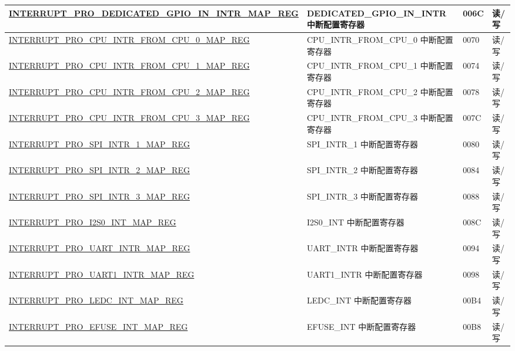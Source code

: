\begin{longtable}{ | m{9.3cm} | m{9.2cm} | m{1.3cm} | m{1.2cm} | }
\hyperref[regdesc:INTERRUPTPRODEDICATEDGPIOININTRMAPREG]{INTERRUPT\_PRO\_DEDICATED\_GPIO\_IN\_INTR\_MAP\_REG} & DEDICATED\_GPIO\_IN\_INTR 中断配置寄存器 & \hexprefix{}006C &读/写 \\ \hline
\hyperref[regdesc:INTERRUPTPROCPUINTRFROMCPU0MAPREG]{INTERRUPT\_PRO\_CPU\_INTR\_FROM\_CPU\_0\_MAP\_REG} & CPU\_INTR\_FROM\_CPU\_0 中断配置寄存器 & \hexprefix{}0070 &读/写 \\ \hline
\hyperref[regdesc:INTERRUPTPROCPUINTRFROMCPU1MAPREG]{INTERRUPT\_PRO\_CPU\_INTR\_FROM\_CPU\_1\_MAP\_REG} & CPU\_INTR\_FROM\_CPU\_1 中断配置寄存器 & \hexprefix{}0074 &读/写 \\ \hline
\hyperref[regdesc:INTERRUPTPROCPUINTRFROMCPU2MAPREG]{INTERRUPT\_PRO\_CPU\_INTR\_FROM\_CPU\_2\_MAP\_REG} & CPU\_INTR\_FROM\_CPU\_2 中断配置寄存器 & \hexprefix{}0078 &读/写 \\ \hline
\hyperref[regdesc:INTERRUPTPROCPUINTRFROMCPU3MAPREG]{INTERRUPT\_PRO\_CPU\_INTR\_FROM\_CPU\_3\_MAP\_REG} & CPU\_INTR\_FROM\_CPU\_3 中断配置寄存器 & \hexprefix{}007C &读/写 \\ \hline
\hyperref[regdesc:INTERRUPTPROSPIINTR1MAPREG]{INTERRUPT\_PRO\_SPI\_INTR\_1\_MAP\_REG} & SPI\_INTR\_1 中断配置寄存器 & \hexprefix{}0080 &读/写 \\ \hline
\hyperref[regdesc:INTERRUPTPROSPIINTR2MAPREG]{INTERRUPT\_PRO\_SPI\_INTR\_2\_MAP\_REG} & SPI\_INTR\_2 中断配置寄存器 & \hexprefix{}0084 &读/写 \\ \hline
\hyperref[regdesc:INTERRUPTPROSPIINTR3MAPREG]{INTERRUPT\_PRO\_SPI\_INTR\_3\_MAP\_REG} & SPI\_INTR\_3 中断配置寄存器 & \hexprefix{}0088 &读/写 \\ \hline
\hyperref[regdesc:INTERRUPTPROI2S0INTMAPREG]{INTERRUPT\_PRO\_I2S0\_INT\_MAP\_REG} & I2S0\_INT 中断配置寄存器 & \hexprefix{}008C &读/写 \\ \hline
\hyperref[regdesc:INTERRUPTPROUARTINTRMAPREG]{INTERRUPT\_PRO\_UART\_INTR\_MAP\_REG} & UART\_INTR 中断配置寄存器 & \hexprefix{}0094 &读/写 \\ \hline
\hyperref[regdesc:INTERRUPTPROUART1INTRMAPREG]{INTERRUPT\_PRO\_UART1\_INTR\_MAP\_REG} & UART1\_INTR 中断配置寄存器 & \hexprefix{}0098 &读/写 \\ \hline
\hyperref[regdesc:INTERRUPTPROLEDCINTMAPREG]{INTERRUPT\_PRO\_LEDC\_INT\_MAP\_REG} & LEDC\_INT 中断配置寄存器 & \hexprefix{}00B4 &读/写 \\ \hline
\hyperref[regdesc:INTERRUPTPROEFUSEINTMAPREG]{INTERRUPT\_PRO\_EFUSE\_INT\_MAP\_REG} & EFUSE\_INT 中断配置寄存器 & \hexprefix{}00B8 &读/写 \\ \hline

\end{longtable}
